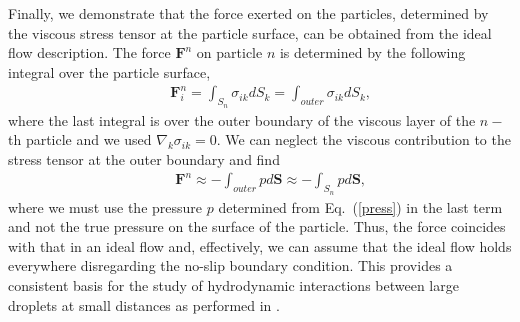 Finally, we demonstrate that the force exerted on the particles, determined by the viscous stress tensor at the particle surface, can be obtained from the ideal flow description.
The force $\bm F^n$ on particle $n$ is determined by the following integral over the particle surface,
\begin{eqnarray}&&%
\bm F^n_i\!= \int_{S_n}\sigma_{ik}dS_k=\int_{outer}\sigma_{ik}dS_k,
\end{eqnarray}
where the last integral is over the outer boundary of the viscous layer of the $n-$th particle and we used $\nabla_k\sigma_{ik}=0$. We can neglect the viscous contribution to the stress tensor at the outer boundary and find
\begin{eqnarray}&&%
\bm F^n\!\approx -\int_{outer}p d\bm S\approx -\int_{S_n}p d\bm S,\label{force}
\end{eqnarray}
where we must use the pressure $p$ determined from Eq.~(\ref{press}) in the last term and not the true pressure on the surface of the particle. Thus, the force 
coincides with that in an ideal flow and, effectively, we can assume that the ideal flow holds everywhere disregarding the no-slip boundary condition. This provides a consistent basis for the study of hydrodynamic interactions between  large droplets at small distances as performed in \cite{is,tl2012}.



